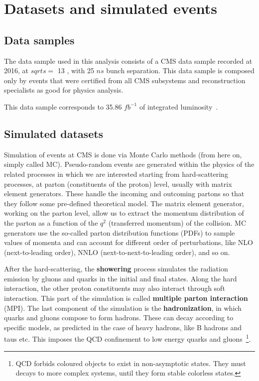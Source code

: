 \section{Datasets and simulated events} \label{datasets_and_MC_samples}

\subsection{Data samples}

The data sample used in this analysis consists of a CMS data sample recorded at 2016, at $sqrt{s} = $ 13 \TeV, with 25 $ns$ bunch separation. This data sample is composed only by events that were certified from all CMS subsystems and reconstruction specialists as good for physics analysis.

This data sample corresponds to 35.86 $fb^{-1}$ of integrated luminosity~\cite{CMS-PAS-LUM-17-001}.

\subsection{Simulated datasets}
\label{sec:datasets}

Simulation of events at CMS is done via Monte Carlo methods (from here on, simply called MC). Pseudo-random events are generated within the physics of the related processes in which we are interested starting from  hard-scattering processes, at parton (constituents of the proton)  level, usually  with matrix element generators. These handle the incoming and outcoming partons so that they follow some pre-defined theoretical model. The matrix element generator, working on the parton level, allow us to extract the momentum distribution of the parton as a function of the $q^2$ (transferred momentum) of the collision.  MC generators use the so-called parton distribution functions (PDFs) to sample values of momenta and can account for different order of perturbations, like NLO (next-to-leading order), NNLO (next-to-next-to-leading order), and so on.

After the hard-scattering, the \textbf{showering} process simulates the radiation emission by gluons and quarks in the initial and final states. Along the hard interaction, the other proton constituents may also interact through soft interaction. This part of the simulation is called \textbf{multiple parton interaction} (MPI). The last component of the simulation is the \textbf{hadronization},  in which quarks and gluons compose to form hadrons. These can decay according to specific models, as predicted in the case of heavy hadrons, like B hadrons and taus etc. This imposes the QCD confinement to low energy quarks and gluons~\footnote{QCD forbids coloured objects to exist in non-asymptotic states. They must decays to more complex systems, until they form stable colorless states.}.

